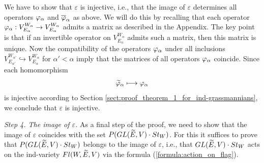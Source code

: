 \documentclass[11pt, a4paper]{article}
\begin{document}
We have to show that $\varepsilon$ is injective, i.e., that the image of $\varepsilon$ determines all operators $\vfi_{\alpha}%
$ and $\overline{\varphi}_{\alpha}$ %
as above. We will do this by %
recalling that each operator $\varphi_{\alpha}:V^{W_{\alpha}}_{E_{\alpha}}\rightarrow V^{W_{\alpha}}_{E_{\alpha}}$ admits a matrix as described in the Appendix. The key point is that if an invertible operator on $V^{W_{\alpha}}_{E_{\alpha}}$ admits such a matrix, then this matrix is unique. Now the compatibility of the operators $\varphi_{\alpha}$ under all inclusions $V^{W_{\alpha'}}_{E_{\alpha'}}\hookrightarrow V^{W_{\alpha}}_{E_{\alpha}}$ for $\alpha'<\alpha$ imply that the matrices of all operators $\varphi_{\alpha}$ coincide. Since each homomorphism $$\widetilde{\varphi}_{\alpha} \longmapsto \varphi_{\alpha}$$ is injective according to Section \ref{sect:proof_theorem_1_for_ind-grassmannians}, we conclude that $\varepsilon$ is injective.




 
\emph{Step 4. The image of $\varepsilon$.} As a final step of the proof, we need to show that the image of $\varepsilon$ coincides with the set $P(GL(\widetilde{E},V)\cdot St_W)$. For this it suffices to prove that $P(GL(\widetilde E,V)\cdot St_W)$ %
belongs to the image of $\varepsilon$, i.e., that $GL(\widetilde E,V)\cdot St_W$ acts on the ind-variety $Fl(W,\widetilde{E},V)$ via the formula (\ref{formula:action_on_flag}). 

 
\end{document}

